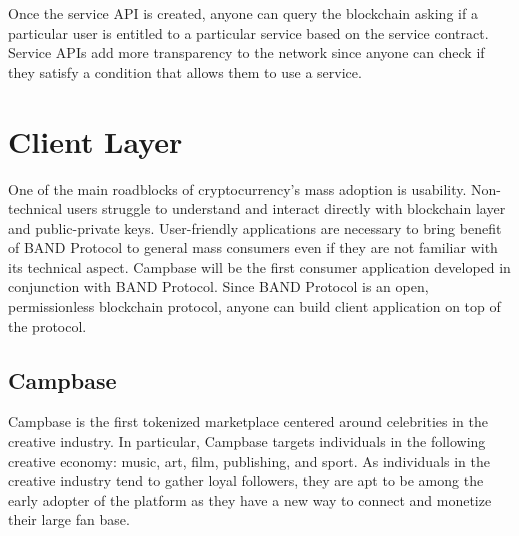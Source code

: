 \documentclass[letterpaper,11pt]{article}
\begin{document}
Once the service API is created, anyone can query the blockchain asking if a particular user is entitled to a particular service based on the service contract. Service APIs add more transparency to the network since anyone can check if they satisfy a condition that allows them to use a service.

\pagebreak

\section{Client Layer}
One of the main roadblocks of cryptocurrency's mass adoption is usability. Non-technical users struggle to understand and interact directly with blockchain layer and public-private keys. User-friendly applications are necessary to bring benefit of BAND Protocol to general mass consumers even if they are not familiar with its technical aspect. Campbase will be the first consumer application developed in conjunction with BAND Protocol. Since BAND Protocol is an open, permissionless blockchain protocol, anyone can build client application on top of the protocol.

\subsection{Campbase}
Campbase is the first tokenized marketplace centered around celebrities in the creative industry. In particular, Campbase targets individuals in the following creative economy: music, art, film, publishing, and sport. As individuals in the creative industry tend to gather loyal followers, they are apt to be among the early adopter of the platform as they have a new way to connect and monetize their large fan base.
\end{document}
